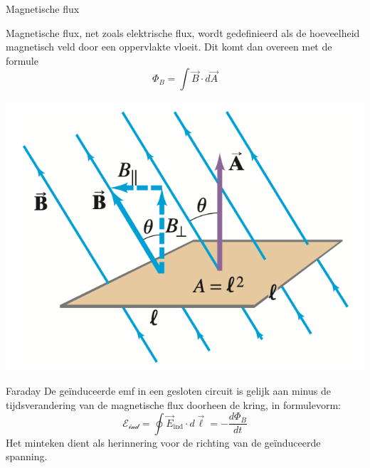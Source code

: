 \newpage

\begin{theo}{Magnetische flux}
    \vspace{-0.65cm}
    \begin{minipage}{0.75\textwidth}
        Magnetische flux, net zoals elektrische flux, wordt gedefinieerd als de hoeveelheid magnetisch veld door een oppervlakte vloeit.
        Dit komt dan overeen met de formule 
        \begin{equation*}
            \Phi_{B} = \int \Vec{B} \cdot d\Vec{A}
        \end{equation*}
    \end{minipage}
    \begin{minipage}{0.21\textwidth}
        \includegraphics[scale=0.35]{Images/Magnetisme/Faraday.png}
    \end{minipage}
    \vspace{-0.15cm}
\end{theo}
    
\begin{lem}[Faraday]{Faraday}
    De geïnduceerde emf in een gesloten circuit is gelijk aan minus de tijdsverandering van de magnetische flux doorheen de kring, in formulevorm:
    \begin{equation*}
        \mathcal{E_{\text{ind}}} = \oint \Vec{E}_{\text{ind}} \cdot d\Vec{\ell} = - \dfrac{d\Phi_{B}}{dt}
    \end{equation*}
    Het minteken dient als herinnering voor de richting van de geïnduceerde spanning.
\end{lem}

